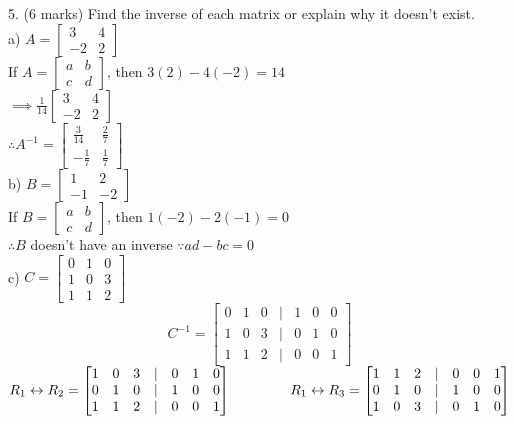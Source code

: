 \documentclass[a4paper]{article}
\newcommand\tab[1][1cm]{\hspace*{#1}}
\begin{document}
5. (6 marks) Find the inverse of each matrix or explain why it doesn't exist.\\
a) $A = \begin{bmatrix}
3&4\\
-2&2
\end{bmatrix}$\\
If $A = \begin{bmatrix}
a&b\\
c&d
\end{bmatrix}$, then $3(2)-4(-2) = 14$\\
$\implies \frac{1}{14}\begin{bmatrix}
3&4\\
-2&2
\end{bmatrix}$\\
$\therefore A^{-1} = \begin{bmatrix}
\frac{3}{14}&\frac{2}{7}\\
-\frac{1}{7}&\frac{1}{7}
\end{bmatrix}$\\
b) $B = \begin{bmatrix}
1&2\\
-1&-2
\end{bmatrix}$\\
If $B = \begin{bmatrix}
a&b\\
c&d
\end{bmatrix}$, then $1(-2)-2(-1) = 0$\\
$\therefore B$ doesn't have an inverse $\because ad - bc = 0$\\ 
c) $C = \begin{bmatrix}
0&1&0\\
1&0&3\\
1&1&2
\end{bmatrix}$\\
$$C^{-1} = \begin{bmatrix}
0&1&0&|&1&0&0\\
1&0&3&|&0&1&0\\
1&1&2&|&0&0&1
\end{bmatrix}$$
$R_1 \leftrightarrow R_2 = \begin{bmatrix}
1&0&3&|&0&1&0\\
0&1&0&|&1&0&0\\
1&1&2&|&0&0&1
\end{bmatrix} \tab[1.5cm]
R_1 \leftrightarrow R_3 = \begin{bmatrix}
1&1&2&|&0&0&1\\
0&1&0&|&1&0&0\\
1&0&3&|&0&1&0
\end{bmatrix}$\\
\end{document}

